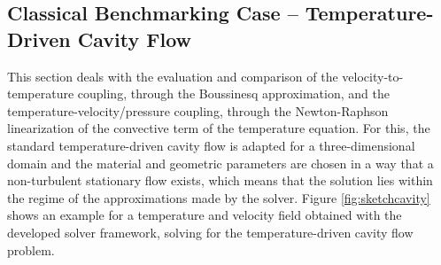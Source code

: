 \subsection{Classical Benchmarking Case -- Temperature-Driven Cavity Flow}

This section deals with the evaluation and comparison of the velocity-to-temperature coupling, through the Boussinesq approximation, and the temperature-velocity/pressure coupling, through the Newton-Raphson linearization of the convective term of the temperature equation. For this, the standard temperature-driven cavity flow \cite{christon02,vahl83} is adapted for a three-dimensional domain and the material and geometric parameters are chosen in a way that a non-turbulent stationary flow exists, which means that the solution lies within the regime of the approximations made by the solver. Figure \ref{fig:sketchcavity} shows an example for a temperature and velocity field obtained with the developed solver framework, solving for the temperature-driven cavity flow problem.

